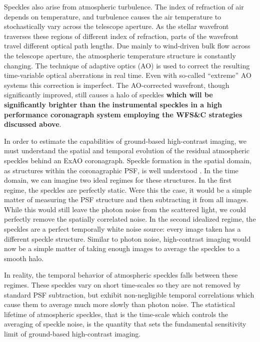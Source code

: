 \documentclass[10pt,preprint]{aastex631}
\begin{document}
Speckles also arise from atmospheric turbulence.  The index of refraction of air depends on temperature, and turbulence causes the air temperature to stochastically vary across the telescope aperture.  As the stellar wavefront traverses these regions of different index of refraction, parts of the wavefront travel different optical path lengths.  Due mainly to wind-driven bulk flow across the telescope aperture, the atmospheric temperature structure is constantly changing.  The technique of adaptive optics (AO) is used to correct the resulting time-variable optical aberrations in real time.  Even with so-called ``extreme'' AO systems \citep[ExAO, ][]{2018ARAA..56..315G} this correction is imperfect.  The AO-corrected wavefront, though significantly improved, still causes a halo of speckles \textbf{which will be significantly brighter than the instrumental speckles in a high performance coronagraph system employing the WFS\&C strategies discussed above}.

In order to estimate the capabilities of ground-based high-contrast imaging, we must understand the spatial and temporal evolution of the residual atmospheric speckles behind an ExAO coronagraph.  Speckle formation in the spatial domain, as structures within the coronagraphic PSF, is well understood \citep{2001ApJ...558L..71B,2003ApJ...596..702P,2007ApJ...669..642S}.  In the time domain, we can imagine two ideal regimes for these structures.  In the first regime, the speckles are perfectly static.  Were this the case, it would be a simple matter of measuring the PSF structure and then subtracting it from all images.  While this would still leave the photon noise from the scattered light, we could perfectly remove the spatially correlated noise.  In the second idealized regime, the speckles are a perfect temporally white noise source: every image taken has a different speckle structure.  Similar to photon noise, high-contrast imaging would now be a simple matter of taking enough images to average the speckles to a smooth halo.

In reality, the temporal behavior of atmospheric speckles falls between these regimes. These speckles vary on short time-scales so they are not removed by standard PSF subtraction, but exhibit non-negligible temporal correlations which cause them to average much more slowly than photon noise.  The statistical lifetime of atmospheric speckles, that is the time-scale which controls the averaging of speckle noise, is the quantity that sets the fundamental sensitivity limit of ground-based high-contrast imaging.
\end{document}
